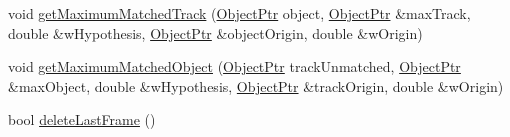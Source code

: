 \begin{DoxyCompactItemize}
void \hyperlink{class_i_m_f_t_a0fc1cd8b04d246ef33f84f5b0c40ac6a}{get\-Maximum\-Matched\-Track} (\hyperlink{class_i_m_f_t_a9f291b28e2caab20361d790d02774dfe}{\-Object\-Ptr} object, \hyperlink{class_i_m_f_t_a9f291b28e2caab20361d790d02774dfe}{\-Object\-Ptr} \&max\-Track, double \&w\-Hypothesis, \hyperlink{class_i_m_f_t_a9f291b28e2caab20361d790d02774dfe}{\-Object\-Ptr} \&object\-Origin, double \&w\-Origin)
\item 
void \hyperlink{class_i_m_f_t_a4fa24de7283cacd230302a47bf9aa424}{get\-Maximum\-Matched\-Object} (\hyperlink{class_i_m_f_t_a9f291b28e2caab20361d790d02774dfe}{\-Object\-Ptr} track\-Unmatched, \hyperlink{class_i_m_f_t_a9f291b28e2caab20361d790d02774dfe}{\-Object\-Ptr} \&max\-Object, double \&w\-Hypothesis, \hyperlink{class_i_m_f_t_a9f291b28e2caab20361d790d02774dfe}{\-Object\-Ptr} \&track\-Origin, double \&w\-Origin)
\item 
bool \hyperlink{class_i_m_f_t_afc129366861aecc3edf1c98fef27f5bf}{delete\-Last\-Frame} ()
\end{DoxyCompactItemize}
